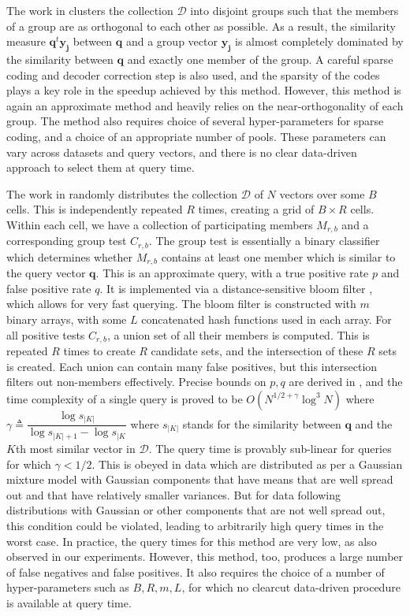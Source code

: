 \documentclass[sigconf, anonymous, review]{acmart}
\begin{document}
The work in \cite{Iscen2018} clusters the collection $\mathcal{D}$ into disjoint groups such that the members of a group are as orthogonal to each other as possible. As a result, the similarity measure $\boldsymbol{q}^t \boldsymbol{y_j}$ between $\boldsymbol{q}$ and a group vector $\boldsymbol{y_j}$ is almost completely dominated by the similarity between $\boldsymbol{q}$ and exactly one member of the group. A careful sparse coding and decoder correction step is also used, and the sparsity of the codes plays a key role in the speedup achieved by this method. However, this method is again an approximate method and heavily relies on the near-orthogonality of each group. The method also requires choice of several hyper-parameters for sparse coding, and a choice of an appropriate number of pools. These parameters can vary across datasets and query vectors, and there is no clear data-driven approach to select them at query time. 

The work in \cite{Engels2021} randomly distributes the collection $\mathcal{D}$ of $N$ vectors over some $B$ cells. This is independently repeated $R$ times, creating a grid of $B \times R$ cells. Within each cell, we have a collection of participating members $M_{r,b}$ and a corresponding group test $C_{r,b}$. The group test is essentially a binary classifier which determines whether $M_{r,b}$ contains at least one member which is similar to the query vector $\boldsymbol{q}$. This is an approximate query, with a true positive rate $p$ and false positive rate $q$. It is implemented via a distance-sensitive bloom filter \cite{Bloom1970,Kirsch2006}, which allows for very fast querying. The bloom filter is constructed with $m$ binary arrays, with some $L$ concatenated hash functions used in each array. For all positive tests $C_{r,b}$, a union set of all their members is computed. This is repeated $R$ times to create $R$ candidate sets, and the intersection of these $R$ sets is created. Each union can contain many false positives, but this intersection filters out non-members effectively. Precise bounds on $p,q$ are derived in \cite{Engels2021}, and the time complexity of a single query is proved to be $O(N^{1/2+\gamma} \log^3 N)$ where $\gamma \triangleq \dfrac{\log s_{|K|}}{\log s_{|K|+1} - \log s_{|K}}$ where $s_{|K|}$ stands for the similarity between $\boldsymbol{q}$ and the $K$th most similar vector in $\mathcal{D}$. The query time is provably sub-linear for queries for which $\gamma < 1/2$. This is obeyed in data which are distributed as per a Gaussian mixture model with Gaussian components that have means that are well spread out and that have relatively smaller variances. But for data following distributions with Gaussian or other components that are not well spread out, this condition could be violated, leading to arbitrarily high query times in the worst case. In practice, the query times for this method are very low, as also observed in our experiments. However, this method, too, produces a large number of false negatives and false positives. It also requires the choice of a number of hyper-parameters such as $B, R, m, L$, for which no clearcut data-driven procedure is available at query time.
\end{document}
